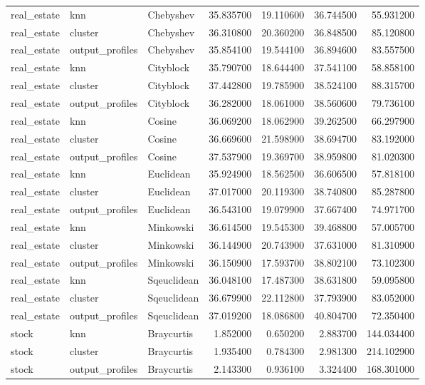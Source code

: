 \begin{tabular}{lllrrrr}
real\_estate & knn & Chebyshev & 35.835700 & 19.110600 & 36.744500 & 55.931200 \\
real\_estate & cluster & Chebyshev & 36.310800 & 20.360200 & 36.848500 & 85.120800 \\
real\_estate & output\_profiles & Chebyshev & 35.854100 & 19.544100 & 36.894600 & 83.557500 \\
real\_estate & knn & Cityblock & 35.790700 & 18.644400 & 37.541100 & 58.858100 \\
real\_estate & cluster & Cityblock & 37.442800 & 19.785900 & 38.524100 & 88.315700 \\
real\_estate & output\_profiles & Cityblock & 36.282000 & 18.061000 & 38.560600 & 79.736100 \\
real\_estate & knn & Cosine & 36.069200 & 18.062900 & 39.262500 & 66.297900 \\
real\_estate & cluster & Cosine & 36.669600 & 21.598900 & 38.694700 & 83.192000 \\
real\_estate & output\_profiles & Cosine & 37.537900 & 19.369700 & 38.959800 & 81.020300 \\
real\_estate & knn & Euclidean & 35.924900 & 18.562500 & 36.606500 & 57.818100 \\
real\_estate & cluster & Euclidean & 37.017000 & 20.119300 & 38.740800 & 85.287800 \\
real\_estate & output\_profiles & Euclidean & 36.543100 & 19.079900 & 37.667400 & 74.971700 \\
real\_estate & knn & Minkowski & 36.614500 & 19.545300 & 39.468800 & 57.005700 \\
real\_estate & cluster & Minkowski & 36.144900 & 20.743900 & 37.631000 & 81.310900 \\
real\_estate & output\_profiles & Minkowski & 36.150900 & 17.593700 & 38.802100 & 73.102300 \\
real\_estate & knn & Sqeuclidean & 36.048100 & 17.487300 & 38.631800 & 59.095800 \\
real\_estate & cluster & Sqeuclidean & 36.679900 & 22.112800 & 37.793900 & 83.052000 \\
real\_estate & output\_profiles & Sqeuclidean & 37.019200 & 18.086800 & 40.804700 & 72.350400 \\
stock & knn & Braycurtis & 1.852000 & 0.650200 & 2.883700 & 144.034400 \\
stock & cluster & Braycurtis & 1.935400 & 0.784300 & 2.981300 & 214.102900 \\
stock & output\_profiles & Braycurtis & 2.143300 & 0.936100 & 3.324400 & 168.301000 \\

\end{tabular}
